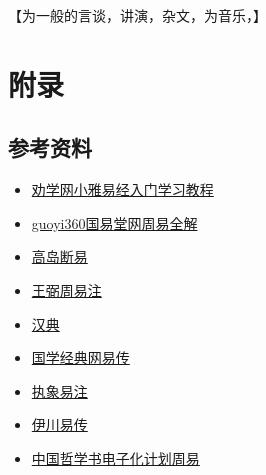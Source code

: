 \documentclass[12pt,oneside]{book}
\begin{document}
【为一般的言谈，讲演，杂文，为音乐，】



\part{附录}
\chapter{参考资料}
\begin{itemize}
\item \href{http://www.quanxue.cn/QT_XiaoYa/YiJingIndex.html}{劝学网小雅易经入门学习教程}
\item \href{http://www.guoyi360.com/zyqs/}{guoyi360国易堂网周易全解}
\item \href{http://www.xshiqi.com/category_zyzs/dgzs/gddy}{高岛断易}
\item \href{http://www.quanxue.cn/QT_MingXiang/ZhouYiZhuIndex.html}{王弼周易注}
\item \href{https://www.zdic.net/}{汉典}
\item \href{http://vsucai.cn/yizhuan/index.html}{国学经典网易传}
\item \href{http://www.xshiqi.com/category_zyzs/dgzs/zxyz/}{执象易注}
\item \href{https://www.eee-learning.com/article/897}{伊川易传}
\item \href{https://ctext.org/book-of-changes/zhs}{中国哲学书电子化计划周易}
\end{itemize}








\end{document}
